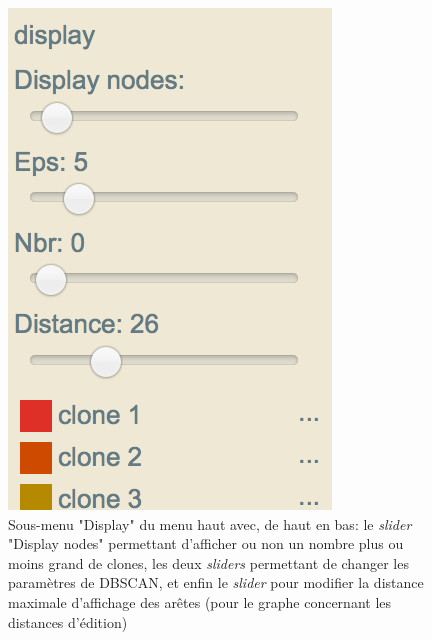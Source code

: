 \documentclass[pdftex,12pt,a4paper]{report}
\begin{document}
\begin{spacing}{1.2}
\begin{figure}[H]
\begin{center}
	\includegraphics{img/Aff_menu_display.jpg}
\end{center}
\caption{Sous-menu "Display" du menu haut avec, de haut en bas: le \textit{slider} "Display nodes" permettant d'afficher ou non un nombre plus ou moins grand de clones, les deux \textit{sliders} permettant de changer les paramètres de DBSCAN, et enfin le \textit{slider} pour modifier la distance maximale d'affichage des arêtes (pour le graphe concernant les distances d'édition)}
\label{fig:menu_display}
\end{figure}


\end{spacing}
\end{document}
